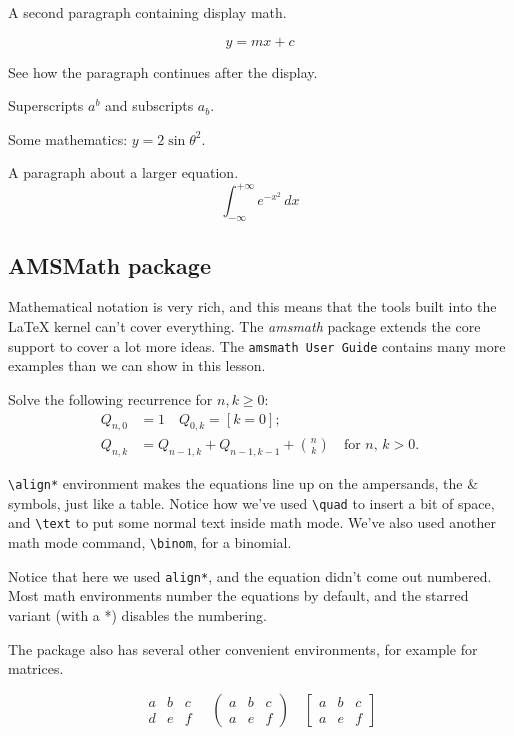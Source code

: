 \documentclass[12]{article}
\begin{document}
    A second paragraph containing display math.

    \[
        y = mx + c
    \]

    See how the paragraph continues after the display.

    Superscripts $a^{b}$ and subscripts $a_{b}$.

    Some mathematics: $y = 2 \sin \theta^{2}$.

    A paragraph about a larger equation.
    \[
        \int_{{-\infty}}^{{+\infty}} {e^{-x^2}} \, d{x}
    \]
    
    \subsection{AMSMath package}%
    \label{sub:amsmath-package}
    Mathematical notation is very rich, and this means that the tools built into the LaTeX kernel can’t cover everything. The \textit{amsmath} package extends the core support to cover a lot more ideas. The \texttt{amsmath User Guide} contains many more examples than we can show in this lesson.

    Solve the following recurrence for $ n,k\geq 0 $:
    \begin{align*}
        \label{eq:amsmath-equation}
        Q_{n,0} &= 1   \quad Q_{0,k} = [k=0];  \\
        Q_{n,k} &= Q_{n-1,k}+Q_{n-1,k-1}+\binom{n}{k} \quad\text{for $n$, $k>0$.}
    \end{align*}

    \verb|\align*| environment makes the equations line up on the ampersands, the \& symbols, just like a table. Notice how we’ve used \verb|\quad| to insert a bit of space, and \verb|\text| to put some normal text inside math mode. We’ve also used another math mode command, \verb|\binom|, for a binomial.

    Notice that here we used \verb|align*|, and the equation didn’t come out numbered. Most math environments number the equations by default, and the starred variant (with a *) disables the numbering.

    The package also has several other convenient environments, for example for matrices.

    \[
    \begin{matrix}
        a & b & c \\
        d & e & f
    \end{matrix}
    \quad
    \begin{pmatrix} 
    a & b & c \\
    a & e & f
    \end{pmatrix} 
    \quad
    \begin{bmatrix} 
    a & b & c \\
    a & e & f
    \end{bmatrix} 
    \]
\end{document}
